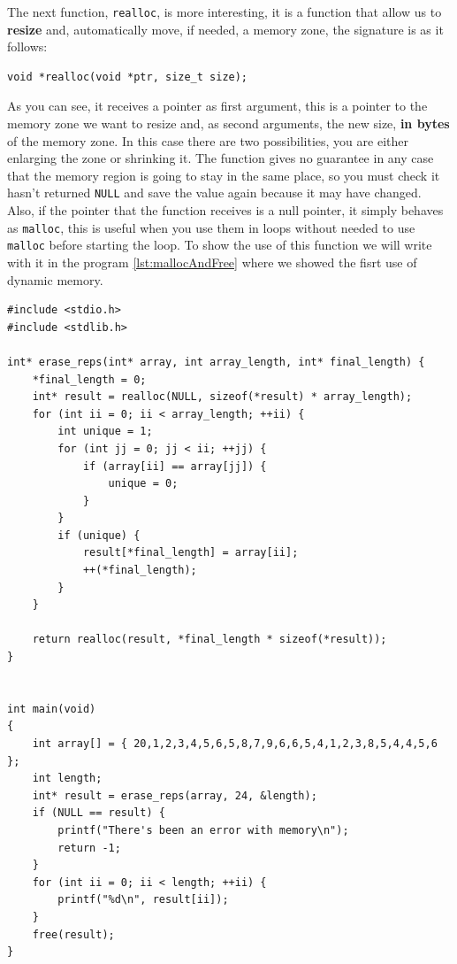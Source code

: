 \documentclass[a4paper]{article}
\begin{document}
The next function, \verb!realloc!, is more interesting, it is a function that
allow us to \textbf{resize} and, automatically move, if needed, a memory zone,
the signature is as it follows:

\noindent
\begin{minipage}[H]{\linewidth}
\mbox{}
\begin{lstlisting}[style=C,
caption={Signature of function \texttt{realloc}},
label={lst:callocSignature}]
void *realloc(void *ptr, size_t size);
\end{lstlisting}
\end{minipage}

As you can see, it receives a pointer as first argument, this is a pointer to
the memory zone we want to resize and, as second arguments, the new size,
\textbf{in bytes} of the memory zone. In this case there are two possibilities,
you are either enlarging the zone or shrinking it. The function gives no
guarantee in any case that the memory region is going to stay in the same place,
so you must check it hasn't returned \verb!NULL! and save the value again
because it may have changed. Also, if the pointer that the function receives is
a null pointer, it simply behaves as \verb"malloc", this is useful when you use
them in loops without needed to use \verb!malloc! before starting the loop.
To show the use of this function we will write with it in the program
\ref{lst:mallocAndFree} where we showed the fisrt use of dynamic memory.

\noindent
\begin{minipage}[H]{\linewidth}
\mbox{}
\begin{lstlisting}[style=C, label={lst:reallocExample},
caption={Use of \texttt{realloc}}]
#include <stdio.h>
#include <stdlib.h>

int* erase_reps(int* array, int array_length, int* final_length) {
    *final_length = 0;
    int* result = realloc(NULL, sizeof(*result) * array_length);
    for (int ii = 0; ii < array_length; ++ii) {
        int unique = 1;
        for (int jj = 0; jj < ii; ++jj) {
            if (array[ii] == array[jj]) {
                unique = 0;
            }
        }
        if (unique) {
            result[*final_length] = array[ii];
            ++(*final_length);
        }
    }

    return realloc(result, *final_length * sizeof(*result));
}


int main(void)
{
    int array[] = { 20,1,2,3,4,5,6,5,8,7,9,6,6,5,4,1,2,3,8,5,4,4,5,6 };
    int length;
    int* result = erase_reps(array, 24, &length);
    if (NULL == result) {
        printf("There's been an error with memory\n");
        return -1;
    }
    for (int ii = 0; ii < length; ++ii) {
        printf("%d\n", result[ii]);
    }
    free(result);
}
\end{lstlisting}
\end{minipage}
\end{document}
